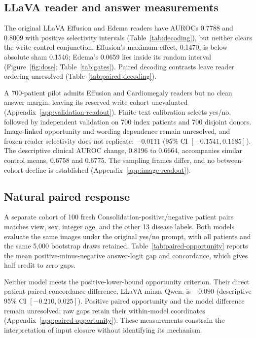 \subsection{LLaVA reader and answer measurements}
\label{sec:generic-results}
The original LLaVA Effusion and Edema readers have AUROCs 0.7788 and 0.8009 with positive selectivity intervals (Table~\ref{tab:decoding}), but neither clears the write-control conjunction. Effusion's maximum effect, 0.1470, is below absolute sham 0.1546; Edema's 0.0659 lies inside its random interval (Figure~\ref{fig:dose}; Table~\ref{tab:gates}). Paired decoding contrasts leave reader ordering unresolved (Table~\ref{tab:paired-decoding}).

A 700-patient pilot admits Effusion and Cardiomegaly readers but no clean answer margin, leaving its reserved write cohort unevaluated (Appendix~\ref{app:validation-readout}). Finite text calibration selects yes/no, followed by independent validation on 700 index patients and 700 disjoint donors. Image-linked opportunity and wording dependence remain unresolved, and frozen-reader selectivity does not replicate: $-0.0111$ (95\% CI $[-0.1541,0.1185]$). The descriptive clinical AUROC change, 0.8196 to 0.6664, accompanies similar control means, 0.6758 and 0.6775. The sampling frames differ, and no between-cohort decline is established (Appendix~\ref{app:image-readout}).

\subsection{Natural paired response}
\label{sec:paired-opportunity}
A separate cohort of 100 fresh Consolidation-positive/negative patient pairs matches view, sex, integer age, and the other 13 disease labels. Both models evaluate the same images under the original yes/no prompt, with all patients and the same 5,000 bootstrap draws retained. Table~\ref{tab:paired-opportunity} reports the mean positive-minus-negative answer-logit gap and concordance, which gives half credit to zero gaps.



Neither model meets the positive-lower-bound opportunity criterion. Their direct patient-paired concordance difference, LLaVA minus Qwen, is $-0.090$ (descriptive 95\% CI $[-0.210,0.025]$). Positive paired opportunity and the model difference remain unresolved; raw gaps retain their within-model coordinates (Appendix~\ref{app:paired-opportunity}). These measurements constrain the interpretation of input closure without identifying its mechanism.


